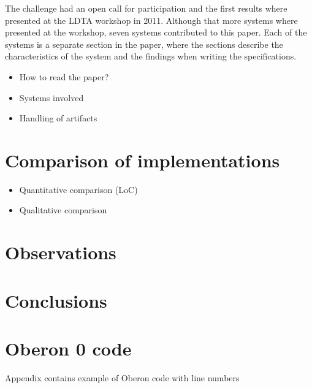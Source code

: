 \documentclass[english,preprint,12pt]{elsarticle}
\begin{document}
The challenge had an open call for participation and the first results where presented at the LDTA workshop
in 2011. 
Although that more systems where presented at the workshop, seven systems contributed to this paper.
Each of the systems is a separate section in the paper, where the sections describe the characteristics
of the system and the findings when writing the specifications.

\begin{itemize}
\item How to read the paper?
\item Systems involved
\item Handling of artifacts
\end{itemize}












\section{Comparison of implementations}
\label{sec:comparison}
\begin{itemize}
\item Quantitative comparison (LoC)
\item Qualitative comparison
\end{itemize}

\section{Observations}
\label{sec:observations}

\section{Conclusions}
\label{sec:conclusions}



\appendix

\section{Oberon 0 code}
\label{sec:samples}
Appendix contains example of Oberon code with line numbers


\end{document}
